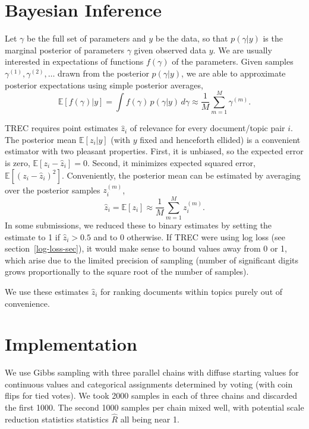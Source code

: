 \documentclass{article}
\begin{document}
\section{Bayesian Inference}

Let $\gamma$ be the full set of parameters and $y$ be the data,
so that $p(\gamma|y)$ is the marginal posterior of parameters
$\gamma$ given observed data $y$.  We are usually interested in
expectations of functions $f(\gamma)$ of the parameters.  Given
samples $\gamma^{(1)},\gamma^{(2)},\ldots$ drawn from the posterior
$p(\gamma|y)$, we are able to approximate posterior expectations
using simple posterior averages,
%
\[
\mathbb{E}[f(\gamma)|y] 
= \int f(\gamma) \, p(\gamma|y) \, d\gamma
\approx
\frac{1}{M} \sum_{m=1}^M \gamma^{(m)}.
\]

TREC requires point estimates $\hat{z}_i$ of relevance for every
document/topic pair $i$.  The posterior mean $\mathbb{E}[z_i|y]$ (with
$y$ fixed and henceforth ellided) is a convenient estimator with two
pleasant properties.  First, it is unbiased, so the expected error is
zero, $\mathbb{E}[z_i - \hat{z}_i] = 0$.  Second, it minimizes
expected squared error, $\mathbb{E}[(z_i - \hat{z}_i)^2]$.
Conveniently, the posterior mean can be estimated by averaging over
the posterior samples $z_i^{(m)}$,
%
\[ 
\hat{z}_i
= \mathbb{E}[z_i] 
\approx \frac{1}{M} \sum_{m=1}^M z_i^{(m)}.  
\] 
%
In some submissions, we reduced these to binary estimates by setting
the estimate to 1 if $\hat{z}_i > 0.5$ and to 0 otherwise.  If TREC
were using log loss (see section~\ref{log-loss-sec}), it would make
sense to bound values away from 0 or 1, which arise due to the limited
precision of sampling (number of significant digits grows
proportionally to the square root of the number of samples).

We use these estimates $\hat{z}_i$ for ranking documents within topics
purely out of convenience.   


\section{Implementation}\label{impl-sec}

We use Gibbs sampling with three parallel chains with diffuse starting
values for continuous values and categorical assignments determined by
voting (with coin flips for tied votes).  We took 2000 samples in each
of three chains and discarded the first 1000.  The second 1000 samples
per chain mixed well, with potential scale reduction statistics
statistics $\hat{R}$ all being near 1.
\end{document}
